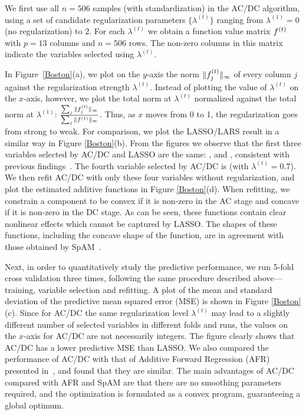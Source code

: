 We first use all $n=506$ samples (with standardization) in the AC/DC algorithm,
using a set of candidate regularization parameters $\{\lambda^{(t)}\}$
ranging from $\lambda^{(1)} = 0$ (no regularization) to $2$. For each $\lambda^{(t)}$
we obtain a function value matrix $f^{(t)}$ with $p=13$
columns and $n=506$ rows. The non-zero columns in this matrix indicate the variables selected using $\lambda^{(t)}$.  

In Figure~\ref{Boston}(a), we plot on the $y$-axis the norm
$\|f^{(t)}_j\|_{\infty}$ of every column $j$ against the
regularization strength $\lambda^{(t)}$. Instead of plotting the value
of $\lambda^{(t)}$ on the $x$-axis,  however, we plot the total norm at
$\lambda^{(t)}$ normalized against the total norm at $\lambda^{(1)}$:
$\frac{\sum_j \|f^{(t)}_j\|_{\infty}}{\sum_j
  \|f^{(1)}\|_{\infty}}$. Thus, as $x$ moves from 0 to 1, the
regularization goes from strong to weak. For comparison, we plot the
LASSO/LARS result in a similar way in Figure \ref{Boston}(b).  From
the figures we observe that the first three variables selected by
AC/DC and LASSO are the same: ,  and ,
consistent with previous findings~\citep{SpAM:07}.  The fourth
variable selected by AC/DC is  (with $\lambda^{(t)}=0.7$).
We then refit AC/DC with only these four variables without
regularization, and plot the estimated additive functions in Figure
\ref{Boston}(d). When refitting, we constrain a component to be convex
if it is non-zero in the AC stage and concave if it is non-zero in the
DC stage. As can be seen, these functions contain clear nonlinear
effects which cannot be captured by LASSO. The shapes of these
functions, including the concave shape of the  function,
are in agreement with those obtained by SpAM~\citep{SpAM:07}.

Next, in order to quantitatively study the predictive performance, we
run 5-fold cross validation three times, following the same procedure
described above---training, variable selection and refitting.  A plot
of the mean and standard deviation of the predictive mean squared
error (MSE) is shown in Figure \ref{Boston}(c). Since for AC/DC the same
regularization level $\lambda^{(t)}$ may lead to a slightly different number of selected
variables in different folds and runs, the values on the $x$-axis
for AC/DC are not necessarily integers. The figure clearly shows that AC/DC has a 
lower predictive MSE than LASSO.  We also compared the performance of
AC/DC with that of Additive Forward Regression (AFR) presented
in~\cite{Xi:09}, and found that they are similar.  The main advantages
of AC/DC compared with AFR and SpAM are that there are no smoothing
parameters required, and the optimization is formulated
as a convex program, guaranteeing a global optimum.

